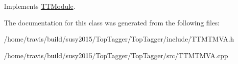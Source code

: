 Implements \hyperlink{classTTModule_a14e7c03fbf4ee1a5008c9344adc7c896}{T\-T\-Module}.



The documentation for this class was generated from the following files\-:\begin{DoxyCompactItemize}
\item 
/home/travis/build/susy2015/\-Top\-Tagger/\-Top\-Tagger/include/T\-T\-M\-T\-M\-V\-A.\-h\item 
/home/travis/build/susy2015/\-Top\-Tagger/\-Top\-Tagger/src/T\-T\-M\-T\-M\-V\-A.\-cpp\end{DoxyCompactItemize}
